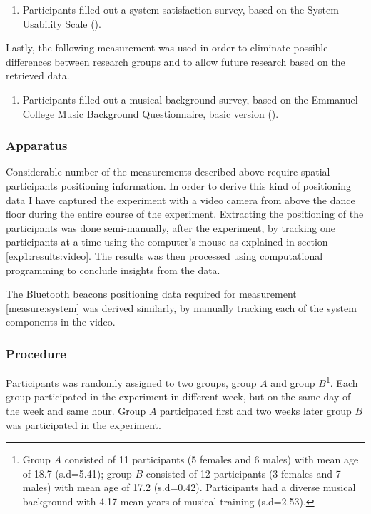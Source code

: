 \documentclass[a4paper,11pt]{article}
\begin{document}
{\begin{enumerate}[resume]
	\item \label{measure:survey:usability} Participants filled out a system satisfaction survey, based on the System Usability Scale (\cite{brooke96}).
\end{enumerate}
Lastly, the following measurement was used in order to eliminate possible differences between research groups and to allow future research based on the retrieved data.
\begin{enumerate}[resume]
	\item \label{measure:survey:musical} Participants filled out a musical background survey, based on the Emmanuel College Music Background Questionnaire, basic version (\cite{web:zhao12}).
\end{enumerate}

\subsubsection{Apparatus}\label{aparatus}

Considerable number of the measurements described above require spatial participants positioning information.
In order to derive this kind of positioning data I have captured the experiment with a video camera from above the dance floor during the entire course of the experiment.
Extracting the positioning of the participants was done semi-manually, after the experiment, by tracking one participants at a time using the computer's mouse as explained in section \ref{exp1:results:video}.
The results was then processed using computational programming to conclude insights from the data.

The Bluetooth beacons positioning data required for measurement \ref{measure:system} was derived similarly, by manually tracking each of the system components in the video.

\subsubsection{Procedure}

Participants was randomly assigned to two groups, group $A$ and group $B$\@\footnote{Group $A$ consisted of 11 participants (5 females and 6 males) with mean age of 18.7 (s.d=5.41); group $B$ consisted of 12 participants (3 females and 7 males) with mean age of 17.2 (s.d=0.42). Participants had a diverse musical background with 4.17 mean years of musical training (s.d=2.53).}.
Each group participated in the experiment in different week, but on the same day of the week and same hour. Group $A$ participated first and two weeks later group $B$ was participated in the experiment.

}
\end{document}
